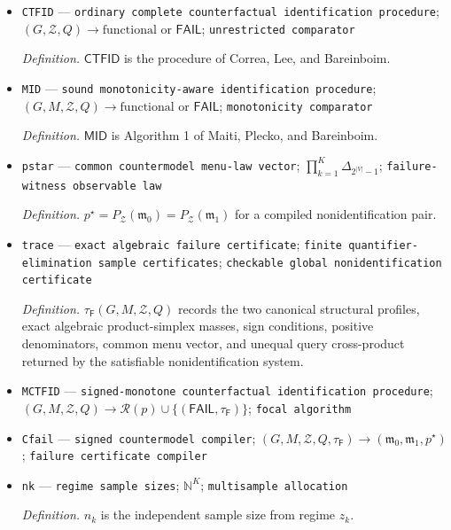 \documentclass{article}
\begin{document}
\begin{itemize}
  \par\smallskip\noindent\emph{Definition.} \(\mathcal R(p)\) is the grammar in Definition \(\mathrm{def:expression\text{-}grammar}\).
  \item \texttt{CTFID} --- \texttt{ordinary complete counterfactual identification procedure}; \((G,\mathcal Z,Q)\to\text{functional or }\mathsf{FAIL}\); \texttt{unrestricted comparator}
  \par\smallskip\noindent\emph{Definition.} \(\mathsf{CTFID}\) is the procedure of Correa, Lee, and Bareinboim.
  \item \texttt{MID} --- \texttt{sound monotonicity-\allowbreak{}aware identification procedure}; \((G,M,\mathcal Z,Q)\to\text{functional or }\mathsf{FAIL}\); \texttt{monotonicity comparator}
  \par\smallskip\noindent\emph{Definition.} \(\mathsf{MID}\) is Algorithm 1 of Maiti, Plecko, and Bareinboim.
  \item \texttt{pstar} --- \texttt{common countermodel menu-\allowbreak{}law vector}; \(\prod_{k=1}^{K}\Delta_{2^{|V|}-1}\); \texttt{failure-\allowbreak{}witness observable law}
  \par\smallskip\noindent\emph{Definition.} \(p^{\star}=P_{\mathcal Z}(\mathfrak m_0)=P_{\mathcal Z}(\mathfrak m_1)\) for a compiled nonidentification pair.
  \item \texttt{trace} --- \texttt{exact algebraic failure certificate}; \texttt{finite quantifier-\allowbreak{}elimination sample certificates}; \texttt{checkable global nonidentification certificate}
  \par\smallskip\noindent\emph{Definition.} \(\tau_{\mathsf F}(G,M,\mathcal Z,Q)\) records the two canonical structural profiles, exact algebraic product-simplex masses, sign conditions, positive denominators, common menu vector, and unequal query cross-product returned by the satisfiable nonidentification system.
  \item \texttt{MCTFID} --- \texttt{signed-\allowbreak{}monotone counterfactual identification procedure}; \((G,M,\mathcal Z,Q)\to\mathcal R(p)\cup\{(\mathsf{FAIL},\tau_{\mathsf F})\}\); \texttt{focal algorithm}
  \item \texttt{Cfail} --- \texttt{signed countermodel compiler}; \((G,M,\mathcal Z,Q,\tau_{\mathsf F})\to(\mathfrak m_0,\mathfrak m_1,p^{\star})\); \texttt{failure certificate compiler}
  \item \texttt{nk} --- \texttt{regime sample sizes}; \(\mathbb N^K\); \texttt{multisample allocation}
  \par\smallskip\noindent\emph{Definition.} \(n_k\) is the independent sample size from regime \(z_k\).

\end{itemize}
\end{document}

